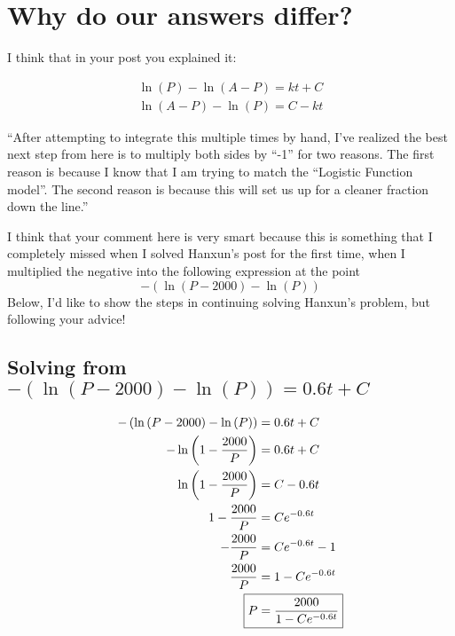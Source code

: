 \documentclass[12pt]{article}
\begin{document}
\setcounter{equation}{0}

\section{Why do our answers differ?}
I think that in your post you explained it:

\begin{align}
  \ln\left(P\right)-\ln\left(A-P\right)=kt+C \\
  \ln\left(A-P\right)-\ln\left(P\right)=C-kt
\end{align}

``After attempting to integrate this multiple times by hand, I've realized the best next step from here is to multiply both sides by ``-1'' for two reasons. The first reason is because I know that I am trying to match the ``Logistic Function model''. The second reason is because this will set us up for a cleaner fraction down the line.''

I think that your comment here is very smart because this is something that I completely missed when I solved Hanxun's post for the first time, when I multiplied the negative into the following expression at the point
$$
  -\left(\ln\left(P-2000\right)-\ln\left(P\right)\right)
$$
\setcounter{equation}{0}
Below, I'd like to show the steps in continuing solving Hanxun's problem, but following your advice!
\subsection{Solving from \texorpdfstring{$-\left(\ln\left(P-2000\right)-\ln\left(P\right)\right)=0.6t+C$}{Lg}}
\begin{align}
  -\left(\ln\left(P-2000\right)-\ln\left(P\right)\right) & =0.6t+C                    \\\
  -\ln\left(1-\frac{2000}{P}\right)                      & =0.6t+C                    \\
  \ln\left(1-\frac{2000}{P}\right)                       & =C-0.6t                    \\
  1-\frac{2000}{P}                                       & =Ce^{-0.6t}                \\
  -\frac{2000}{P}                                        & =Ce^{-0.6t}-1              \\
  \frac{2000}{P}                                         & =1-Ce^{-0.6t}              \\
  \Aboxed{P                                                      & =\frac{2000}{1-Ce^{-0.6t}}}
\end{align}
\setcounter{equation}{0}
\end{document}
